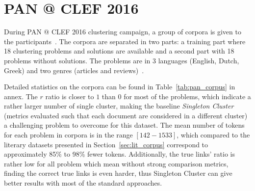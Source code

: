 \section{PAN @ CLEF 2016}

During PAN @ CLEF 2016 clustering campaign, a group of corpora is given to the participants~\cite{pan16_corpus}.
The corpora are separated in two parts: a training part where 18 clustering problems and solutions are available and a second part with 18 problems without solutions.
The problems are in 3 languages (English, Dutch, Greek) and two genres (articles and reviews)~\cite{pan16}.

Detailed statistics on the corpora can be found in Table~\ref{tab:pan_corpus} in annex.
The $r$ ratio is closer to $1$ than $0$ for most of the problems, which indicate a rather larger number of single cluster, making the baseline \textit{Singleton Cluster} (metrics evaluated such that each document are considered in a different cluster) a challenging problem to overcome for this dataset.
The mean number of tokens for each problem in corpora is in the range $[142-1533]$, which compared to the literary datasets presented in Section~\ref{sec:lit_corpus} correspond to approximately 85\% to 98\% fewer tokens.
Additionally, the true links' ratio is rather low for all problem which mean without strong comparison metrics, finding the correct true links is even harder, thus Singleton Cluster can give better results with most of the standard approaches.
